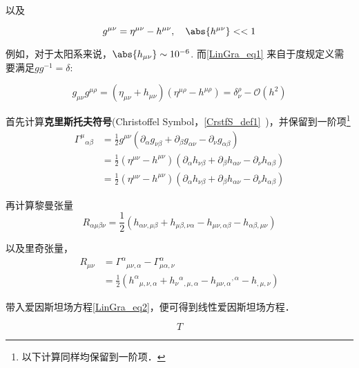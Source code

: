 以及

\begin{equation}\label{LinGra_eq1}
g^{\mu\nu} = \eta^{\mu\nu} - h^{\mu\nu} , \quad \abs{h^{\mu\nu}}<<1 
\end{equation}



例如，对于太阳系来说，$\abs{h_{\mu\nu}} \sim 10^{-6}$. 而\autoref{LinGra_eq1} 来自于度规定义需要满足$gg^{-1}=\delta$:

\begin{equation}
g_{\mu\nu}g^{\mu\rho} = (\eta_{\mu\nu} + h_{\mu\nu})(\eta^{\mu\rho} - h^{\mu\rho}) = \delta^{\rho}_{\nu} - \mathcal{O}(h^2)
\end{equation}

首先计算\textbf{克里斯托夫符号}(Christoffel Symbol，\autoref{CrstfS_def1}~)，并保留到一阶项\footnote{以下计算同样均保留到一阶项．}
\begin{align}
\Gamma^{\mu}{}_{\alpha\beta}&=\frac{1}{2}g^{\mu\nu}(\partial_\alpha g_{\nu\beta} + \partial_\beta g_{\alpha\nu} - \partial_\nu g_{\alpha\beta})\\
&=\frac{1}{2}(\eta^{\mu\nu} - h^{\mu\nu})(\partial_\alpha h_{\nu\beta} + \partial_\beta h_{\alpha\nu} - \partial_\nu h_{\alpha\beta})\\
&=\frac{1}{2}(\eta^{\mu\nu} - h^{\mu\nu})(\partial_\alpha h_{\nu\beta} + \partial_\beta h_{\alpha\nu} - \partial_\nu h_{\alpha\beta})
\end{align}


再计算黎曼张量
\begin{equation}
R_{\alpha \mu \beta \nu}=\frac{1}{2}\left(h_{\alpha \nu, \mu \beta}+h_{\mu \beta, \nu \alpha}-h_{\mu \nu, \alpha \beta}-h_{\alpha \beta, \mu \nu}\right)
\end{equation}


以及里奇张量，
\begin{align}
R_{\mu\nu} &= \Gamma^{\alpha}{}_{\mu\nu,\alpha} - \Gamma^{\alpha}_{\mu\alpha,\nu}\\

&=\frac{1}{2}\left(h^{\alpha}{}_{\mu, \nu ,\alpha} + h_{\nu}{ }^{\alpha}{ }_{, \mu ,\alpha}-h_{\mu \nu, \alpha}{ }^{,\alpha}-h_{, \mu ,\nu}\right)
\end{align}



带入爱因斯坦场方程\autoref{LinGra_eq2}，便可得到线性爱因斯坦场方程．

\begin{equation}
T
\end{equation}

